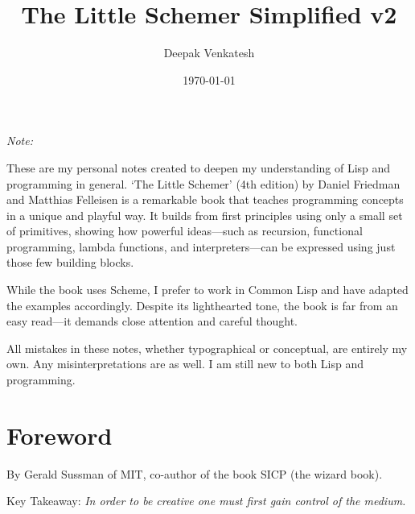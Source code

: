 \documentclass[11pt]{article}
\author{Deepak Venkatesh}
\date{\today}
\title{The Little Schemer Simplified v2}
\begin{document}
\maketitle
\tableofcontents

\newpage
\emph{Note:}

\vspace{1em}

These are my personal notes created to deepen my understanding of Lisp and programming in general. `The Little Schemer'
(4th edition) by Daniel Friedman and Matthias Felleisen is a remarkable book that teaches programming concepts in a
unique and playful way. It builds from first principles using only a small set of primitives, showing how powerful
ideas—such as recursion, functional programming, lambda functions, and interpreters—can be expressed using just
those few building blocks.

While the book uses Scheme, I prefer to work in Common Lisp and have adapted the examples accordingly. Despite its
lighthearted tone, the book is far from an easy read—it demands close attention and careful thought.

All mistakes in these notes, whether typographical or conceptual, are entirely my own. Any misinterpretations are as
well. I am still new to both Lisp and programming.

\newpage
\section{Foreword}
\label{sec:org3b82342}

By Gerald Sussman of MIT, co-author of the book SICP (the wizard book).

\vspace{1em}

Key Takeaway:
\emph{In order to be creative one must first gain control of the medium.}

\vspace{1em}
\end{document}
